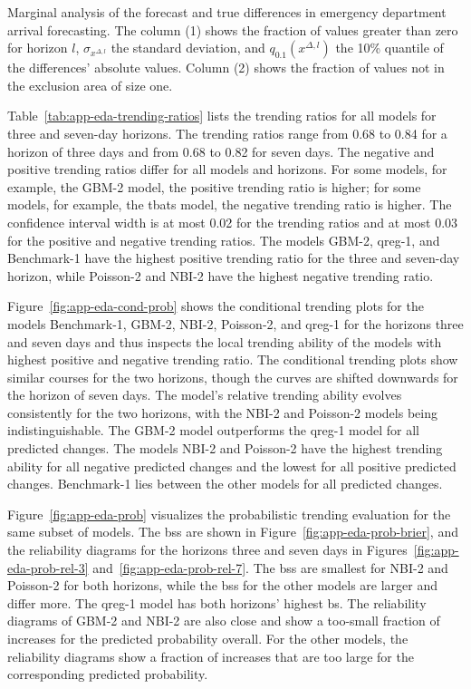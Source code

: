 \documentclass[pdflatex]{sn-jnl}
\theoremstyle{plain}%
\theoremstyle{definition}
\begin{document}
\begin{table}
    \centering
    \tiny
    
    \caption[Marginal analysis of the forecast and true differences in emergency department arrival forecasting.]{Marginal analysis of the forecast and true differences in emergency department arrival forecasting. The column (1) shows the fraction of values greater than zero for horizon $l$, $\sigma_{x^{\Delta, l}}$ the standard deviation, and $q_{0.1} (x^{\Delta, l})$ the 10\% quantile of the differences' absolute values. Column (2) shows the fraction of values not in the exclusion area of size one.}
    \label{tab:app-eda-marginals}
\end{table}

Table~\ref{tab:app-eda-trending-ratios} lists the trending ratios for all models for three and seven-day horizons.
The trending ratios range from 0.68 to 0.84 for a horizon of three days and from 0.68 to 0.82 for seven days.
The negative and positive trending ratios differ for all models and horizons.
For some models, for example, the GBM-2 model, the positive trending ratio is higher; for some models, for example, the tbats model, the negative trending ratio is higher.
The confidence interval width is at most 0.02 for the trending ratios and at most 0.03 for the positive and negative trending ratios.
The models GBM-2, qreg-1, and Benchmark-1 have the highest positive trending ratio for the three and seven-day horizon, while Poisson-2 and NBI-2 have the highest negative trending ratio.

Figure~\ref{fig:app-eda-cond-prob} shows the conditional trending plots for the models Benchmark-1, GBM-2, NBI-2, Poisson-2, and qreg-1 for the horizons three and seven days and thus inspects the local trending ability of the models with highest positive and negative trending ratio.
The conditional trending plots show similar courses for the two horizons, though the curves are shifted downwards for the horizon of seven days.
The model's relative trending ability evolves consistently for the two horizons, with the NBI-2 and Poisson-2 models being indistinguishable.
The GBM-2 model outperforms the qreg-1 model for all predicted changes.
The models NBI-2 and Poisson-2 have the highest trending ability for all negative predicted changes and the lowest for all positive predicted changes.
Benchmark-1 lies between the other models for all predicted changes.

Figure~\ref{fig:app-eda-prob} visualizes the probabilistic trending evaluation for the same subset of models.
The \acfp{bs} are shown in Figure~\ref{fig:app-eda-prob-brier}, and the reliability diagrams for the horizons three and seven days in Figures~\ref{fig:app-eda-prob-rel-3} and~\ref{fig:app-eda-prob-rel-7}.
The \acp{bs} are smallest for NBI-2 and Poisson-2 for both horizons, while the \acp{bs} for the other models are larger and differ more.
The qreg-1 model has both horizons' highest \ac{bs}.
The reliability diagrams of GBM-2 and NBI-2 are also close and show a too-small fraction of increases for the predicted probability overall.
For the other models, the reliability diagrams show a fraction of increases that are too large for the corresponding predicted probability.
\end{document}
